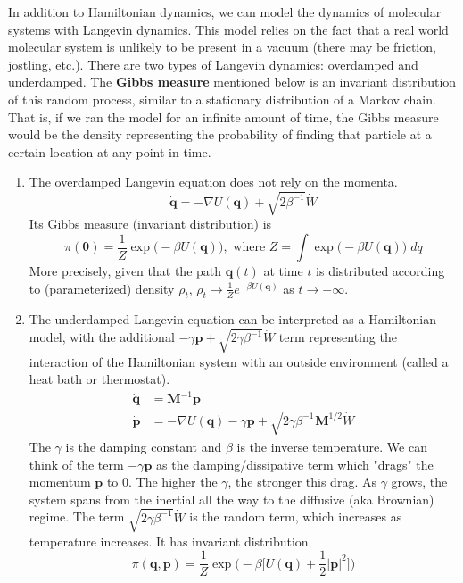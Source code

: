 \documentclass{article}
\begin{document}
    In addition to Hamiltonian dynamics, we can model the dynamics of molecular systems with Langevin dynamics. This model relies on the fact that a real world molecular system is unlikely to be present in a vacuum (there may be friction, jostling, etc.). There are two types of Langevin dynamics: overdamped and underdamped. The \textbf{Gibbs measure} mentioned below is an invariant distribution of this random process, similar to a stationary distribution of a Markov chain. That is, if we ran the model for an infinite amount of time, the Gibbs measure would be the density representing the probability of finding that particle at a certain location at any point in time. 
    \begin{enumerate}
      \item The overdamped Langevin equation does not rely on the momenta. 
      \begin{equation}
        \mathbf{\dot{q}} = - \nabla U(\mathbf{q}) + \sqrt{2 \beta^{-1}} \dot{W}
      \end{equation}
      Its Gibbs measure (invariant distribution) is 
      \begin{equation}
        \pi(\boldsymbol{\theta}) = \frac{1}{Z} \exp\big( - \beta U(\mathbf{q})\big), \text{ where } Z = \int \exp\big( - \beta U(\mathbf{q})\big)\; dq
      \end{equation}
      More precisely, given that the path $\mathbf{q}(t)$ at time $t$ is distributed according to (parameterized) density $\rho_t$, $\rho_t \rightarrow \frac{1}{Z} e^{-\beta U(\mathbf{q})}$ as $t \rightarrow +\infty$. 
      \item The underdamped Langevin equation can be interpreted as a Hamiltonian model, with the additional $- \gamma \mathbf{p} + \sqrt{2\gamma \beta^{-1}} \dot{W}$ term representing the interaction of the Hamiltonian system with an outside environment (called a heat bath or thermostat). 
      \begin{align*}
        \mathbf{\dot{q}} & = \mathbf{M}^{-1} \mathbf{p} \\
        \mathbf{\dot{p}} & = - \nabla U(\mathbf{q}) - \gamma \mathbf{p} + \sqrt{2\gamma \beta^{-1}} \mathbf{M}^{1/2} \dot{W}
      \end{align*}
      The $\gamma$ is the damping constant and $\beta$ is the inverse temperature. We can think of the term $-\gamma \mathbf{p}$ as the damping/dissipative term which "drags" the momentum $\mathbf{p}$ to $0$. The higher the $\gamma$, the stronger this drag. As $\gamma$ grows, the system spans from the inertial all the way to the diffusive (aka Brownian) regime. The term $\sqrt{2 \gamma \beta^{-1}} \dot{W}$ is the random term, which increases as temperature increases. It has invariant distribution 
      \begin{equation}
        \pi(\boldsymbol{q}, \boldsymbol{p}) = \frac{1}{Z} \exp\big( -\beta \big[ U(\mathbf{q}) + \frac{1}{2} |\mathbf{p}|^2\big] \big)
      \end{equation}
    \end{enumerate}
\end{document}
